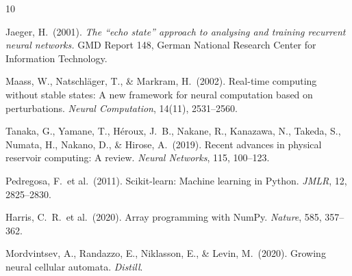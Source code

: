 \documentclass[11pt,a4paper]{article}
\begin{document}
\begin{thebibliography}{10}

Jaeger, H.\ (2001). \textit{The ``echo state'' approach to analysing and
training recurrent neural networks.} GMD Report 148, German National Research
Center for Information Technology.

Maass, W., Natschläger, T., \& Markram, H.\ (2002). Real-time computing without
stable states: A new framework for neural computation based on perturbations.
\textit{Neural Computation}, 14(11), 2531--2560.

Tanaka, G., Yamane, T., Héroux, J.~B., Nakane, R., Kanazawa, N., Takeda, S.,
Numata, H., Nakano, D., \& Hirose, A.\ (2019). Recent advances in physical
reservoir computing: A review. \textit{Neural Networks}, 115, 100--123.

Pedregosa, F.\ et al.\ (2011). Scikit-learn: Machine learning in Python.
\textit{JMLR}, 12, 2825--2830.

Harris, C.~R.\ et al.\ (2020). Array programming with NumPy.
\textit{Nature}, 585, 357--362.

Mordvintsev, A., Randazzo, E., Niklasson, E., \& Levin, M.\ (2020). Growing
neural cellular automata. \textit{Distill}.

\end{thebibliography}
\end{document}
